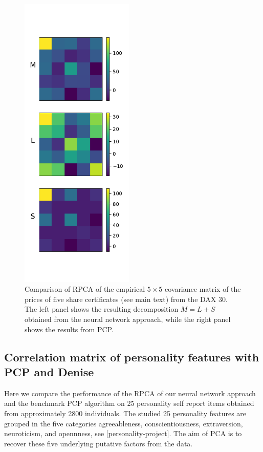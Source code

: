 \begin{figure}
	\includegraphics[width=0.48\textwidth]{fig/pcp_output_finance.pdf}
	\caption{Comparison of RPCA of the empirical $5\times 5$ covariance matrix of the prices of five share certificates (see main text) from the DAX 30. The left panel shows the resulting decomposition $M=L+S$ obtained from the neural network approach, while the right panel shows the results from PCP.}
	\label{fig:comp_finance}
\end{figure}


\subsection{Correlation matrix of personality features with PCP and Denise}
Here we compare the performance of the RPCA of our neural network approach and the benchmark PCP algorithm on 25 personality self report items obtained from approximately 2800 individuals. The studied 25 personality features are grouped in the five categories agreeableness, conscientiousness, extraversion, neuroticism, and opennness, see \href{https://www.personality-project.org/r/html/bfi.html}[personality-project]. The aim of PCA is to recover these five underlying putative factors from the data.

